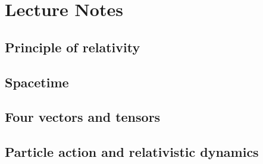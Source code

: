 %
%
%
%
%
\part{Lecture Notes}
   \chapter{Principle of relativity}
      
      

   \chapter{Spacetime}
      
      
      
      

   \chapter{Four vectors and tensors}
      
      

   \chapter{Particle action and relativistic dynamics}
      
      
      
      
      
      
      

